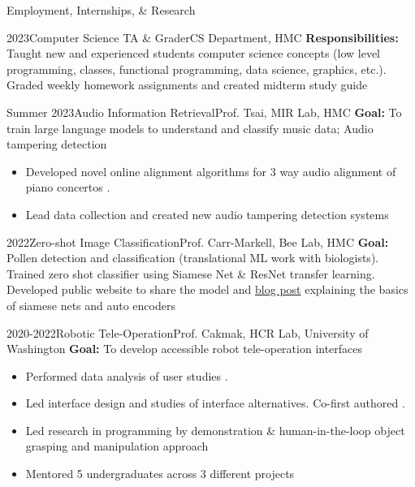 \documentclass[]{mcdowellcv}
\begin{document}
\begin{cvsection}{Employment, Internships, \& Research}
	\begin{cvsubsection}{2023}{Computer Science TA \& Grader}{CS Department, HMC}
		\vspace{0.2em}
		\textbf{Responsibilities:} Taught new and experienced students computer science concepts (low level programming, classes, functional programming, data science, graphics, etc.). Graded weekly homework assignments and created midterm study guide
	\end{cvsubsection}

	\begin{cvsubsection}{Summer 2023}{Audio Information Retrieval}{Prof. Tsai, MIR Lab, HMC}
		\textbf{Goal:} To train large language models to understand and classify music data; Audio tampering detection
		\begin{itemize}
			\item Developed novel online alignment algorithms for 3 way audio alignment of piano concertos .
			\item Lead data collection and created new audio tampering detection systems
		\end{itemize}
	\end{cvsubsection}

	\begin{cvsubsection}{2022}{Zero-shot Image Classification}{Prof. Carr-Markell, Bee Lab, HMC}
		\textbf{Goal:} Pollen detection and classification (translational ML work with biologists). Trained zero shot classifier using Siamese Net \& ResNet transfer learning. Developed public website to share the model and \href{https://hmcbee.blogspot.com/2022/12/blue-bees-twin-neural-networks-and-more.html}{blog post} explaining the basics of siamese nets and auto encoders
	\end{cvsubsection}

	\begin{cvsubsection}{2020-2022}{Robotic Tele-Operation}{Prof. Cakmak, HCR Lab, University of Washington}
		\textbf{Goal:} To develop accessible robot tele-operation interfaces
		\begin{itemize}
			\item Performed data analysis of user studies .
			\item Led interface design and studies of interface alternatives. Co-first authored  .
			\item Led research in programming by demonstration \& human-in-the-loop object grasping and manipulation approach
			\item Mentored 5 undergraduates across 3 different projects
		\end{itemize}
	\end{cvsubsection}


\end{cvsection}
\end{document}
